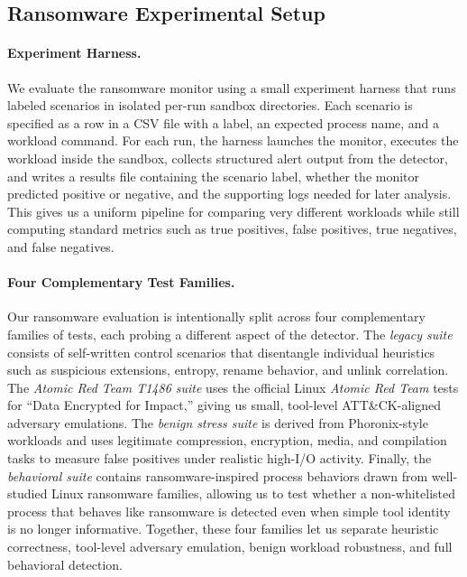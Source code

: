 \documentclass[twocolumn, 10pt]{scrartcl}
\begin{document}
\subsection{Ransomware Experimental Setup}
\paragraph{Experiment Harness.}
We evaluate the ransomware monitor using a small experiment harness that runs labeled scenarios in isolated per-run sandbox directories. Each scenario is specified as a row in a CSV file with a label, an expected process name, and a workload command. For each run, the harness launches the monitor, executes the workload inside the sandbox, collects structured alert output from the detector, and writes a results file containing the scenario label, whether the monitor predicted positive or negative, and the supporting logs needed for later analysis. This gives us a uniform pipeline for comparing very different workloads while still computing standard metrics such as true positives, false positives, true negatives, and false negatives.

\paragraph{Four Complementary Test Families.}
Our ransomware evaluation is intentionally split across four complementary families of tests, each probing a different aspect of the detector. The \emph{legacy suite} consists of self-written control scenarios that disentangle individual heuristics such as suspicious extensions, entropy, rename behavior, and unlink correlation. The \emph{Atomic Red Team T1486 suite} uses the official Linux \emph{Atomic Red Team} tests for ``Data Encrypted for Impact,'' giving us small, tool-level ATT\&CK-aligned adversary emulations. The \emph{benign stress suite} is derived from Phoronix-style workloads and uses legitimate compression, encryption, media, and compilation tasks to measure false positives under realistic high-I/O activity. Finally, the \emph{behavioral suite} contains ransomware-inspired process behaviors drawn from well-studied Linux ransomware families, allowing us to test whether a non-whitelisted process that behaves like ransomware is detected even when simple tool identity is no longer informative. Together, these four families let us separate heuristic correctness, tool-level adversary emulation, benign workload robustness, and full behavioral detection.
\end{document}
